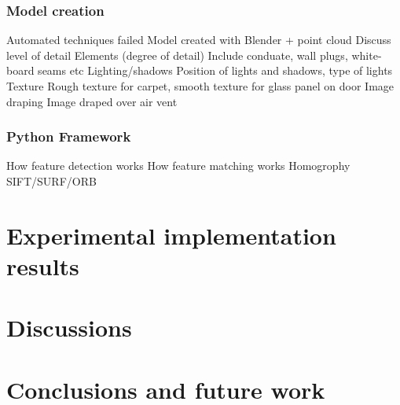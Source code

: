 \documentclass[11pt,a4paper]{article}
\begin{document}
		\subsubsection{Model creation}
			Automated techniques failed
			Model created with Blender + point cloud
			Discuss level of detail
				Elements (degree of detail)
					Include conduate, wall plugs, white-board seams etc
				Lighting/shadows
					Position of lights and shadows, type of lights
				Texture
					Rough texture for carpet, smooth texture for glass panel on door
				Image draping
					Image draped over air vent
		\subsubsection{Python Framework}
			How feature detection works
			How feature matching works
			Homogrophy
			SIFT/SURF/ORB
					

\section{Experimental implementation results}

\section{Discussions}

\section{Conclusions and future work}

\newpage
\printbibliography
\end{document}
